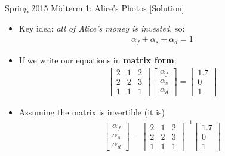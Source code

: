 \begin{frame}{Spring 2015 Midterm 1: Alice's Photos [Solution]}
    \begin{itemize}
        \color{blue}
        \item<blue@1-> Key idea: \textit{all of Alice’s money is invested}, so:
        \begin{align*}
            \alpha_f + \alpha_s + \alpha_d = 1
        \end{align*}
        \item<blue@1-> If we write our equations in \textbf{matrix form}:
        \begin{align*}
            \begin{bmatrix}
                2 & 1 & 2 \\
                2 & 2 & 3 \\
                1 & 1 & 1
            \end{bmatrix} 
            \begin{bmatrix}
                \alpha_f \\ \alpha_s \\ \alpha_d
            \end{bmatrix} = 
            \begin{bmatrix}
                1.7 \\ 0 \\ 1
            \end{bmatrix}
        \end{align*}
        \item<blue@1-> Assuming the matrix is invertible (it is)
        \begin{align*}
            \begin{bmatrix}
                \alpha_f \\ \alpha_s \\ \alpha_d
            \end{bmatrix} = 
            \begin{bmatrix}
                2 & 1 & 2 \\
                2 & 2 & 3 \\
                1 & 1 & 1
            \end{bmatrix}^{-1}
            \begin{bmatrix}
                1.7 \\ 0 \\ 1
            \end{bmatrix}
        \end{align*}
    \end{itemize}
\end{frame}

